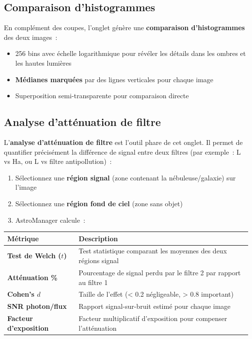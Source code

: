 \documentclass[a4paper,11pt]{article}
\begin{document}
\subsection{Comparaison d'histogrammes}

En compl\'{e}ment des coupes, l'onglet g\'{e}n\`{e}re une \textbf{comparaison d'histogrammes} des deux images~:

\begin{itemize}
    \item 256 bins avec \'{e}chelle logarithmique pour r\'{e}v\'{e}ler les d\'{e}tails dans les ombres et les hautes lumi\`{e}res
    \item \textbf{M\'{e}dianes marqu\'{e}es} par des lignes verticales pour chaque image
    \item Superposition semi-transparente pour comparaison directe
\end{itemize}

\subsection{Analyse d'att\'{e}nuation de filtre}

L'\textbf{analyse d'att\'{e}nuation de filtre} est l'outil phare de cet onglet. Il permet de quantifier pr\'{e}cis\'{e}ment la diff\'{e}rence de signal entre deux filtres (par exemple~: L vs Ha, ou L vs filtre antipollution)~:

\begin{enumerate}
    \item S\'{e}lectionnez une \textbf{r\'{e}gion signal} (zone contenant la n\'{e}buleuse/galaxie) sur l'image
    \item S\'{e}lectionnez une \textbf{r\'{e}gion fond de ciel} (zone sans objet)
    \item AstroManager calcule~:
\end{enumerate}

\begin{center}
\begin{tabularx}{\textwidth}{l X}
\toprule
\textbf{M\'{e}trique} & \textbf{Description} \\
\midrule
\textbf{Test de Welch ($t$)} & Test statistique comparant les moyennes des deux r\'{e}gions signal \\
\textbf{Att\'{e}nuation \%} & Pourcentage de signal perdu par le filtre 2 par rapport au filtre 1 \\
\textbf{Cohen's $d$} & Taille de l'effet (< 0.2 n\'{e}gligeable, > 0.8 important) \\
\textbf{SNR photon/flux} & Rapport signal-sur-bruit estim\'{e} pour chaque image \\
\textbf{Facteur d'exposition} & Facteur multiplicatif d'exposition pour compenser l'att\'{e}nuation \\
\bottomrule
\end{tabularx}
\end{center}
\end{document}
